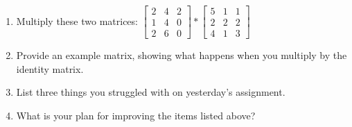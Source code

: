 \documentclass[11pt]{article}
\begin{document}
\begin{enumerate}
\begin{enumerate}
\item Multiply these two matrices: $
\begin{bmatrix}
   2 & 4 & 2 \\
    1 & 4 & 0 \\
    2 & 6 & 0
\end{bmatrix}
*
\begin{bmatrix}
5 & 1 & 1 \\
2 & 2 & 2 \\
4 & 1 & 3
\end{bmatrix}
$
\item Provide an example matrix, showing what happens when you multiply by the identity matrix. 
\item List three things you struggled with on yesterday's assignment. 
\item What is your plan for improving the items listed above?
\end{enumerate}

\end{enumerate}
\end{document}
